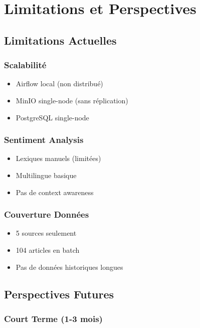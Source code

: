 \documentclass[12pt,a4paper]{report}
\begin{document}
\chapter{Limitations et Perspectives}

\section{Limitations Actuelles}

\subsection{Scalabilité}

\begin{itemize}
    \item Airflow local (non distribué)
    \item MinIO single-node (sans réplication)
    \item PostgreSQL single-node
\end{itemize}

\subsection{Sentiment Analysis}

\begin{itemize}
    \item Lexiques manuels (limitées)
    \item Multilingue basique
    \item Pas de context awareness
\end{itemize}

\subsection{Couverture Données}

\begin{itemize}
    \item 5 sources seulement
    \item 104 articles en batch
    \item Pas de données historiques longues
\end{itemize}

\section{Perspectives Futures}

\subsection{Court Terme (1-3 mois)}
\end{document}
